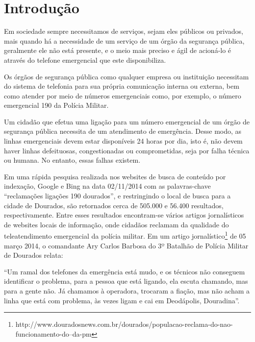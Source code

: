 
\chapter{Introdução}%
Em sociedade sempre necessitamos de serviços, sejam eles públicos ou privados, mais quando há a necessidade de um serviço de um órgão da segurança pública, geralmente ele não está presente, e o meio mais preciso e ágil de acioná-lo é através do telefone emergencial que este disponibiliza.

Os órgãos de segurança pública como qualquer empresa ou instituição necessitam do sistema de telefonia para sua própria comunicação interna ou externa, bem como atender por meio de números emergenciais como, por exemplo, o número emergencial 190 da Polícia Militar.

Um cidadão que efetua uma ligação para um número emergencial de um órgão de segurança pública necessita de um atendimento de emergência. Desse modo, as linhas emergenciais devem estar disponíveis 24 horas por dia, isto é, não devem haver linhas defeituosas, congestionadas ou comprometidas, seja por falha técnica ou humana. No entanto, essas falhas existem.

Em uma rápida pesquisa realizada nos websites de busca de conteúdo por indexação, Google e Bing na data 02/11/2014 com as palavras-chave ``reclamações ligações 190 dourados'', e restringindo o local de busca para a cidade de Dourados, são retornados cerca de 505.000 e 56.400 resultados, respectivamente. Entre esses resultados encontram-se vários artigos jornalísticos de websites locais de informação, onde cidadãos reclamam da qualidade do teleatendimento emergencial da polícia militar. Em um artigo jornalístico\footnote{http://www.douradosnews.com.br/dourados/populacao-reclama-do-nao-funcionamento-do--da-pm} de 05 março 2014, o comandante Ary Carlos Barbosa do 3º Batalhão de Polícia Militar de Dourados relata:

\begin{citacao}
``Um ramal dos telefones da emergência está mudo, e os técnicos não conseguem identificar o problema, para a pessoa que está ligando, ela escuta chamando, mas para a gente não. Já chamamos à operadora, trocaram a fiação, mas não acham a linha que está com problema, às vezes ligam e cai em Deodápolis, Douradina''.
\end{citacao}

